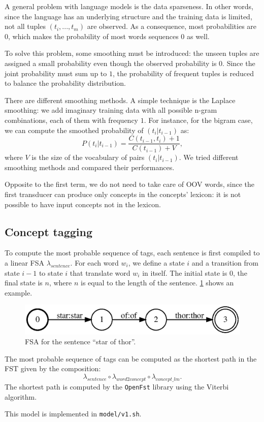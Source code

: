 A general problem with language models is the data sparseness.
In other words, since the language has an underlying structure and the training data is limited, not all tuples $(t_i, ..., t_m)$ are observed.
As a consequence, most probabilities are $0$, which makes the probability of most words sequences $0$ as well.

To solve this problem, some smoothing must be introduced:
the unseen tuples are assigned a small probability even though the observed probability is $0$.
Since the joint probability must sum up to $1$, the probability of frequent tuples is reduced to balance the probability distribution.

There are different smoothing methods.
A simple technique is the Laplace smoothing:
we add imaginary training data with all possible n-gram combinations, each of them with frequency $1$.
For instance, for the bigram case, we can compute the smoothed probability of $(t_i | t_{i-1})$ as:
\begin{equation*}
    P(t_i | t_{i-1}) = \frac{C(t_{i-1}, t_i) + 1}{C(t_{i-1}) + V},
\end{equation*}
where $V$ is the size of the vocabulary of pairs $(t_i | t_{i-1})$.
We tried different smoothing methods and compared their performances.

Opposite to the first term, we do not need to take care of \ac{OOV} words, since the first transducer can produce only concepts in the concepts' lexicon: it is not possible to have input concepts not in the lexicon.

\subsection{Concept tagging}
To compute the most probable sequence of tags, each sentence is first compiled to a linear \ac{FSA} $\lambda_{sentence}$.
For each word $w_i$, we define a state $i$ and a transition from state $i-1$ to state $i$ that translate word $w_i$ in itself.
The initial state is $0$, the final state is $n$, where $n$ is equal to the length of the sentence.
\cref{fig:fsa_sentence} shows an example.

\begin{figure}[h]
	\centering
	\includegraphics[width=.9\columnwidth]{figures/fsa}
	\caption{\ac{FSA} for the sentence ``star of thor''.}
	\label{fig:fsa_sentence}
\end{figure}

The most probable sequence of tags can be computed as the shortest path in the \ac{FST} given by the composition:
\begin{equation*}
    \lambda_{sentence} \circ \lambda_{word2concept} \circ \lambda_{concept\_lm}.
\end{equation*}
The shortest path is computed by the \texttt{OpenFst} library using the Viterbi algorithm.

This model is implemented in \texttt{model/v1.sh}.
